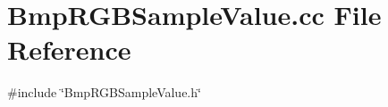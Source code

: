 \section{Bmp\+R\+G\+B\+Sample\+Value.\+cc File Reference}
\label{BmpRGBSampleValue_8cc}
{\ttfamily \#include \char`\"{}Bmp\+R\+G\+B\+Sample\+Value.\+h\char`\"{}}\newline
